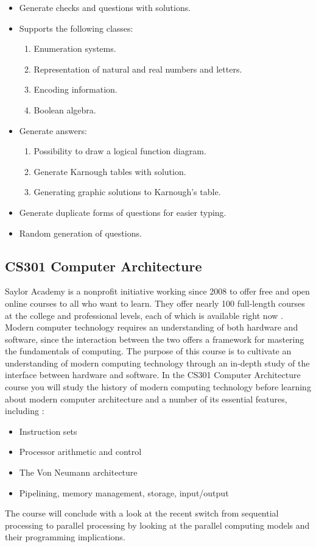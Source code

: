 \begin{itemize}
	\item Generate checks and questions with solutions.
	\item Supports the following classes:
	\begin{enumerate}
		\item Enumeration systems.
		\item Representation of natural and real numbers and letters.
		\item Encoding information.
		\item Boolean algebra.
	\end{enumerate}
	\item Generate answers:
	\begin{enumerate}
		\item Possibility to draw a logical function diagram.
		\item Generate Karnough tables with solution.
		\item Generating graphic solutions to Karnough's table.
	\end{enumerate}
	\item Generate duplicate forms of questions for easier typing.
	\item Random generation of questions.
\end{itemize}

 

 \subsection{CS301 Computer Architecture }
 Saylor Academy is a nonprofit initiative working since 2008 to offer free and open online courses to all who want to learn.
  They offer nearly 100 full-length courses at the college and professional levels, each of which is available right now .
 Modern computer technology requires an understanding of both hardware and software, since the interaction between the two 
 offers a framework for mastering the fundamentals of computing. The purpose of this course is to cultivate an understanding 
 of modern computing technology through an in-depth study of the interface between hardware and software. In the CS301 Computer Architecture course
  you will study the history of modern computing technology before learning about modern computer architecture and a number
   of its essential features, including :
 \begin{itemize}
	 \item Instruction sets
	 \item Processor arithmetic and control
	 \item The Von Neumann architecture
	 \item Pipelining, memory management, storage, input/output
 \end{itemize}  
 The course will conclude with a look at the recent switch from sequential processing to parallel processing by looking at the parallel
  computing models and their programming implications.\cite{Computer-Architecture-saylor-academy}
 
